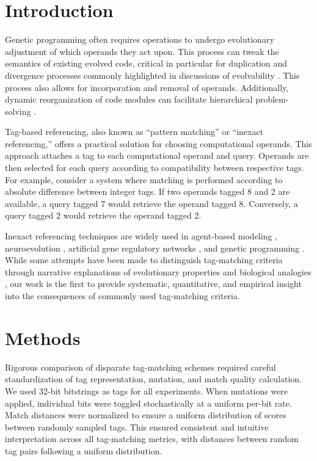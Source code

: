 \section{Introduction} \label{sec:introduction}

Genetic programming often requires operations to undergo evolutionary adjustment of which operands they act upon.
This process can tweak the semantics of existing evolved code, critical in particular for duplication and divergence processes commonly highlighted in discussions of evolvability \citep{altenberg1994evolution}.
This process also allows for incorporation and removal of operands.
Additionally, dynamic reorganization of code modules can facilitate hierarchical problem-solving \citep{Kinnear:Koza:1994:adf}.

Tag-based referencing, also known as ``pattern matching'' or ``inexact referencing,'' offers a practical solution for choosing computational operands.
This approach attaches a tag to each computational operand and query.
Operands are then selected for each query according to compatibility between respective tags.
For example, consider a system where matching is performed according to absolute difference between integer tags.
If two operands tagged 8 and 2 are available, a query tagged 7 would retrieve the operand tagged 8.
Conversely, a query tagged 2 would retrieve the operand tagged 2.

Inexact referencing techniques are widely used in agent-based modeling \citep{riolo2001evolution}, neuroevolution \citep{reisinger2007acquiring}, artificial gene regulatory networks \citep{banzhaf2003artificial}, and genetic programming \citep{spector2011tag, lalejini2018evolving}.
While some attempts have been made to distinguish tag-matching criteria through narrative explanations of evolutionary properties and biological analogies \citep{downing2015intelligence,scherer2004activation}, our work is the first to provide systematic, quantitative, and empirical insight into the consequences of commonly used tag-matching criteria.

\section{Methods}

Rigorous comparison of disparate tag-matching schemes required careful standardization of tag representation, mutation, and match quality calculation.
We used 32-bit bitstrings as tags for all experiments.
When mutations were applied, individual bits were toggled stochastically at a uniform per-bit rate.
Match distances were normalized to ensure a uniform distribution of scores between randomly sampled tags.
This ensured consistent and intuitive interpretation across all tag-matching metrics, with distances between random tag pairs following a uniform distribution.

